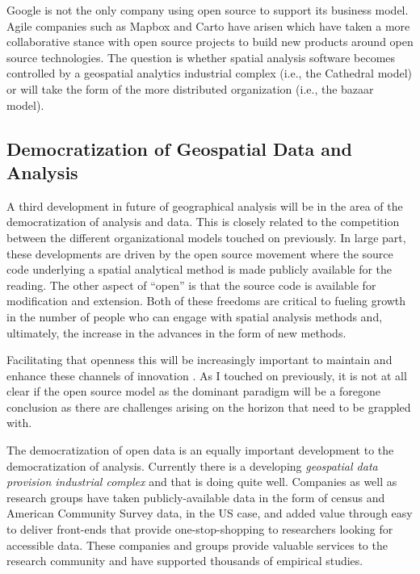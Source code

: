 \documentclass[11pt]{article}
\begin{document}
Google is not the only company using open source to support its business model.
Agile companies such as Mapbox and Carto have arisen which have taken a more
collaborative stance with open source projects to build new products around
open source technologies. The question is whether spatial analysis software
becomes controlled by a geospatial analytics industrial complex (i.e., the
Cathedral model) or will take the form of the more distributed organization
(i.e., the bazaar model).

\subsection{Democratization of Geospatial Data and Analysis}
\label{sec:org3bf5ccc}
A third development in future of geographical analysis will be in the area of
the democratization of analysis and data. This is closely related to the
competition between the different organizational models touched on previously.
In large part, these developments are driven by the open source movement where
the source code underlying a spatial analytical method is made publicly
available for the reading. The other aspect of ``open'' is that the source code
is available for modification and extension. Both of these freedoms are critical
to fueling growth in the number of people who can engage with spatial analysis
methods and, ultimately, the increase in the advances in the form of new
methods.

Facilitating that openness this will be increasingly important to maintain and
enhance these channels of innovation \cite{rey_show_2009}. As I touched on
previously, it is not at all clear if the open source model as the dominant
paradigm will be a foregone conclusion as there are challenges arising on the
horizon that need to be grappled with.

The democratization of open data is an equally important development to the
democratization of analysis. Currently there is a developing \emph{geospatial
data provision industrial complex} and that is doing quite well. Companies
\cite{ncdb_2018} as well as research groups \cite{ipums_2018,Logan_2014} have
taken publicly-available data in the form of census and American Community
Survey data, in the US case, and added value through easy to deliver front-ends
that provide one-stop-shopping to researchers looking for accessible data. These
companies and groups provide valuable services to the research community and
have supported thousands of empirical studies.
\end{document}

